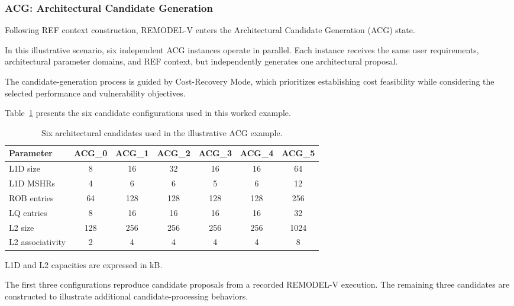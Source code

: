 \subsubsection{ACG: Architectural Candidate Generation}
\label{app:illustrative_acg}

Following REF context construction,
REMODEL-V enters the Architectural
Candidate Generation (ACG) state.

In this illustrative scenario, six
independent ACG instances operate in
parallel. Each instance receives the
same user requirements, architectural
parameter domains, and REF context,
but independently generates one
architectural proposal.

The candidate-generation process is
guided by Cost-Recovery Mode, which
prioritizes establishing cost feasibility
while considering the selected performance
and vulnerability objectives.

Table~\ref{tab:illustrative_acg_candidates}
presents the six candidate configurations
used in this worked example.

\begin{table}[htbp]
\centering
\caption{Six architectural candidates used
in the illustrative ACG example.}
\label{tab:illustrative_acg_candidates}
\small
\renewcommand{\arraystretch}{1.1}
\begin{tabular}{lcccccc}
\hline
\textbf{Parameter} &
\textbf{ACG\_0} &
\textbf{ACG\_1} &
\textbf{ACG\_2} &
\textbf{ACG\_3} &
\textbf{ACG\_4} &
\textbf{ACG\_5} \\
\hline
L1D size & 8 & 16 & 32 & 16 & 16 & 64 \\
L1D MSHRs & 4 & 6 & 6 & 5 & 6 & 12 \\
ROB entries & 64 & 128 & 128 & 128 & 128 & 256 \\
LQ entries & 8 & 16 & 16 & 16 & 16 & 32 \\
L2 size & 128 & 256 & 256 & 256 & 256 & 1024 \\
L2 associativity & 2 & 4 & 4 & 4 & 4 & 8 \\
\hline
\end{tabular}

\vspace{2pt}
\footnotesize
L1D and L2 capacities are expressed in kB.
\end{table}

The first three configurations reproduce
candidate proposals from a recorded
REMODEL-V execution. The remaining
three candidates are constructed to
illustrate additional candidate-processing
behaviors.

